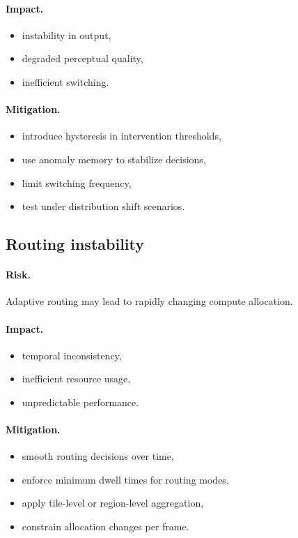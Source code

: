 \documentclass[11pt]{article}
\theoremstyle{definition}
\theoremstyle{plain}
\begin{document}
\paragraph{Impact.}
\begin{itemize}[leftmargin=1.5em]
    \item instability in output,
    \item degraded perceptual quality,
    \item inefficient switching.
\end{itemize}

\paragraph{Mitigation.}
\begin{itemize}[leftmargin=1.5em]
    \item introduce hysteresis in intervention thresholds,
    \item use anomaly memory to stabilize decisions,
    \item limit switching frequency,
    \item test under distribution shift scenarios.
\end{itemize}


\subsection{Routing instability}

\paragraph{Risk.}
Adaptive routing may lead to rapidly changing compute allocation.

\paragraph{Impact.}
\begin{itemize}[leftmargin=1.5em]
    \item temporal inconsistency,
    \item inefficient resource usage,
    \item unpredictable performance.
\end{itemize}

\paragraph{Mitigation.}
\begin{itemize}[leftmargin=1.5em]
    \item smooth routing decisions over time,
    \item enforce minimum dwell times for routing modes,
    \item apply tile-level or region-level aggregation,
    \item constrain allocation changes per frame.
\end{itemize}
\end{document}

